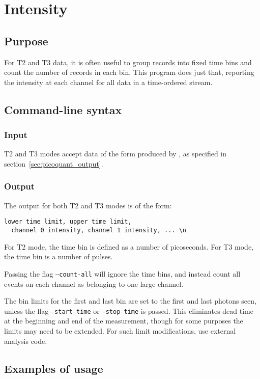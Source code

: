 \section{Intensity}
\subsection{Purpose}
For T2 and T3 data, it is often useful to group records into fixed time bins and count the number of records in each bin. This program does just that, reporting the intensity at each channel for all data in a time-ordered stream. 

\subsection{Command-line syntax}


\subsubsection{Input}
T2 and T3 modes accept data of the form produced by , as specified in section~\ref{sec:picoquant_output}.

\subsubsection{Output}
The output for both T2 and T3 modes is of the form:
\begin{verbatim}
lower time limit, upper time limit, 
  channel 0 intensity, channel 1 intensity, ... \n
\end{verbatim}
For T2 mode, the time bin is defined as a number of picoseconds. For T3 mode, the time bin is a number of pulses.

Passing the flag \texttt{--count-all} will ignore the time bins, and instead count all events on each channel as belonging to one large channel. 

The bin limits for the first and last bin are set to the first and last photons seen, unless the flag \texttt{--start-time} or \texttt{--stop-time} is passed. This eliminates dead time at the beginning and end of the measurement, though for some purposes the limits may need to be extended. For such limit modifications, use external analysis code.

\subsection{Examples of usage}
